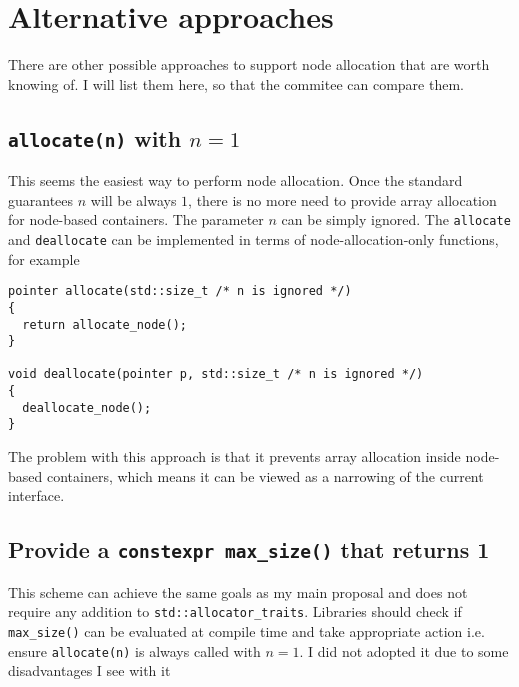 \documentclass[11pt]{article}
\begin{document}
\appendix

\section{Alternative approaches} \label{alternative}

There are other possible approaches to support node allocation that are worth knowing
of.  I will list them here, so that the commitee can compare them.

\subsection{\texttt{allocate(n)} with $n = 1$}

This seems the easiest
way to perform node allocation. Once the standard guarantees $n$ will be always $1$,
there is no more need to provide array allocation for node-based containers. The
parameter $n$ can be simply ignored. The \texttt{allocate} and \texttt{deallocate}
can be implemented in terms of node-allocation-only functions, for example
\medskip
\begin{lstlisting}
pointer allocate(std::size_t /* n is ignored */)
{
  return allocate_node();
}

void deallocate(pointer p, std::size_t /* n is ignored */)
{
  deallocate_node();
}
\end{lstlisting}

The problem with this approach is that it prevents array allocation inside
node-based containers, which means it can be viewed as a narrowing of the
current interface.

\subsection{Provide a \texttt{constexpr max\_size()} that returns 1}


This scheme
can achieve the same goals as my main proposal and does not require any
addition to \texttt{std::allocator\_traits}. Libraries should check if
\texttt{max\_size()} can be evaluated at compile time and take appropriate
action i.e. ensure \texttt{allocate(n)} is always called with $n = 1$.
I did not adopted it due to some disadvantages I see with it
\end{document}
